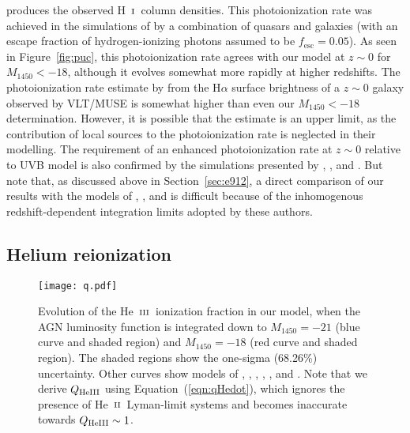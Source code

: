 \documentclass[fleqn,usenatbib]{mnras}
\def\HI{\hbox{H~$\scriptstyle\rm I$}}
\def\nHeIII{{\rm HeIII}}
\def\HeII{\hbox{He~$\scriptstyle\rm II$}}
\def\HeIII{\hbox{He~$\scriptstyle\rm III$}}
\def\HeIII{\hbox{He~$\scriptstyle\rm III$}}
\begin{document}
      produces the observed \HI\ column densities.  This photoionization
      rate was achieved in the simulations of \citet{2015ApJ...811....3S} by
      a combination of quasars and galaxies (with an escape fraction of
      hydrogen-ionizing photons assumed to be $f_\mathrm{esc}=0.05$).  As
      seen in Figure~\ref{fig:puc}, this photoionization rate agrees with
      our model at $z\sim 0$ for $M_{1450}<-18$, although it evolves
      somewhat more rapidly at higher redshifts.  The photoionization rate
      estimate by \citet{2017MNRAS.467.4802F} from the H$\alpha$ surface
      brightness of a $z\sim 0$ galaxy observed by VLT/MUSE is somewhat
      higher than even our $M_{1450}<-18$ determination.  However, it is
      possible that the \citet{2017MNRAS.467.4802F} estimate is an upper
      limit, as the contribution of local sources to the photoionization
      rate is neglected in their modelling.  The requirement of an enhanced
      photoionization rate at $z\sim 0$ relative to
      \citet{2012ApJ...746..125H} UVB model is also confirmed by the
      simulations presented by \citet{2017MNRAS.467L..86V},
      \citet{2017ApJ...837..106O}, and \citet{2018arXiv180104931P}.  But
      note that, as discussed above in Section~\ref{sec:e912}, a direct
      comparison of our results with the models of
      \citet{2015ApJ...813L...8M}, \citet{2015MNRAS.451L..30K}, and
      \citet{2018arXiv180104931P} is difficult because of the inhomogenous
      redshift-dependent integration limits adopted by these authors.

      \subsection{Helium reionization}

      \begin{figure}
        \begin{center}
          \texttt{[image: q.pdf]}
        \end{center}
        \caption{Evolution of the \HeIII\ ionization fraction in our model,
          when the AGN luminosity function is integrated down to
          $M_{1450}=-21$ (blue curve and shaded region) and $M_{1450}=-18$
          (red curve and shaded region).  The shaded regions show the
          one-sigma (68.26\%) uncertainty.  Other curves show models of
          \citet[solid grey]{2012ApJ...746..125H}, \citet[dashed
            grey]{2015ApJ...813L...8M}, \citet[brown with shaded
            region]{2016ApJ...828...90L}, \citet[blue]{2018arXiv180104931P},
          \citet[maroon]{2009ApJ...694..842M}, and
          \citet[green]{2014MNRAS.445.4186C}.  Note that we derive
          $Q_\nHeIII$ using Equation~(\ref{eqn:qHedot}), which ignores the
          presence of \HeII\ Lyman-limit systems and becomes inaccurate
          towards $Q_\nHeIII\sim 1$. \label{fig:qhe}}
      \end{figure}
\end{document}
